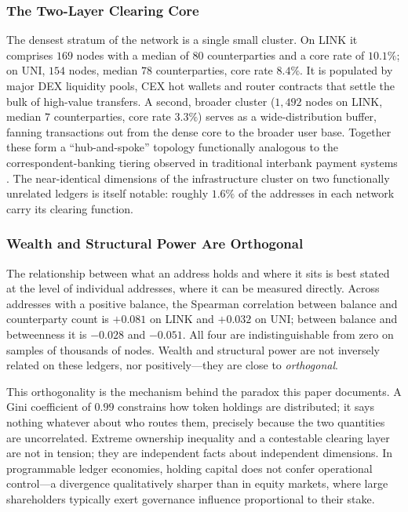 \documentclass[final,5p,times]{elsarticle}
\begin{document}
\subsubsection{The Two-Layer Clearing Core}
The densest stratum of the network is a single small cluster. On LINK it comprises $169$ nodes with a median of $80$ counterparties and a core rate of $10.1\%$; on UNI, $154$ nodes, median $78$ counterparties, core rate $8.4\%$. It is populated by major DEX liquidity pools, CEX hot wallets and router contracts that settle the bulk of high-value transfers. A second, broader cluster ($1{,}492$ nodes on LINK, median $7$ counterparties, core rate $3.3\%$) serves as a wide-distribution buffer, fanning transactions out from the dense core to the broader user base. Together these form a ``hub-and-spoke'' topology functionally analogous to the correspondent-banking tiering observed in traditional interbank payment systems \cite{kindleberger2011manias}. The near-identical dimensions of the infrastructure cluster on two functionally unrelated ledgers is itself notable: roughly $1.6\%$ of the addresses in each network carry its clearing function.

\subsubsection{Wealth and Structural Power Are Orthogonal}
\label{sec:wealth-power}
The relationship between what an address holds and where it sits is best stated at the level of individual addresses, where it can be measured directly. Across addresses with a positive balance, the Spearman correlation between balance and counterparty count is $+0.081$ on LINK and $+0.032$ on UNI; between balance and betweenness it is $-0.028$ and $-0.051$. All four are indistinguishable from zero on samples of thousands of nodes. Wealth and structural power are not inversely related on these ledgers, nor positively---they are close to \emph{orthogonal}.

This orthogonality is the mechanism behind the paradox this paper documents. A Gini coefficient of $0.99$ constrains how token holdings are distributed; it says nothing whatever about who routes them, precisely because the two quantities are uncorrelated. Extreme ownership inequality and a contestable clearing layer are not in tension; they are independent facts about independent dimensions. In programmable ledger economies, holding capital does not confer operational control---a divergence qualitatively sharper than in equity markets, where large shareholders typically exert governance influence proportional to their stake.
\end{document}
